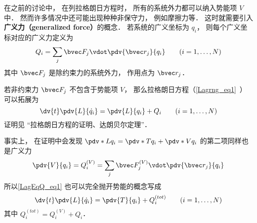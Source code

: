 
\begin{issues}
\issueDraft
\end{issues}


在之前的讨论中， 在列拉格朗日方程时， 所有的系统外力都可以纳入势能项 $V$ 中． 然而许多情况中还可能出现种种非保守力， 例如摩擦力等． 这时就需要引入\textbf{广义力（generalized force）}的概念． 若系统的广义坐标为 $q_i$， 则每个广义坐标对应的广义力定义为
\begin{equation}
Q_i = \sum_j \bvec F_j \vdot \pdv{\bvec r_j}{q_i} \qquad (i=1,\dots,N)
\end{equation}
其中 $\bvec F_j$ 是除约束力的系统外力， 作用点为 $\bvec r_j$．

若非约束力 $\bvec F_j$ 不包含于势能项 $V$， 那么拉格朗日方程（\autoref{Lagrng_eq1}~）可以拓展为
\begin{equation}\label{LagEqQ_eq1}
\dv{t} \pdv{L}{\dot q_i} = \pdv{L}{q_i} + Q_i
\qquad (i=1,\dots,N)
\end{equation}
证明见 “拉格朗日方程的证明、达朗贝尔定理”．

事实上， 在证明中会发现 $\pdv*{L}{q_i} = \pdv*{T}{q_i} + \pdv*{V}{q_i}$ 的第二项同样也是广义力
\begin{equation}
\pdv{V}{q_i} = Q_i^{(V)} = \sum_j \bvec F_j^{(V)} \vdot \pdv{\bvec r_j}{q_i}
\end{equation}
所以\autoref{LagEqQ_eq1} 也可以完全抛开势能的概念写成
\begin{equation}
\dv{t} \pdv{L}{\dot q_i} = \pdv{T}{q_i} + Q_i^{(tot)}
\qquad (i=1,\dots,N)
\end{equation}
其中 $Q_i^{(tot)} = Q_i^{(V)} + Q_i$．

